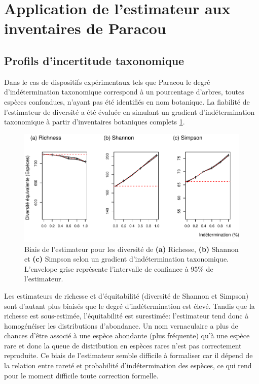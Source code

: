 \documentclass[
  11pt,
  french,
  A4paper,
  extrafontsizes,onecolumn,openright
  ]{memoir}
\begin{document}
\section{Application de l'estimateur aux inventaires de
Paracou}\label{application-de-lestimateur-aux-inventaires-de-paracou}

\subsection{Profils d'incertitude
taxonomique}\label{profils-dincertitude-taxonomique}

Dans le cas de dispositifs expérimentaux tels que Paracou le degré
d'indétermination taxonomique correspond à un pourcentage d'arbres,
toutes espèces confondues, n'ayant pas été identifiés en nom botanique.
La fiabilité de l'estimateur de diversité a été évaluée en simulant un
gradient d'indétermination taxonomique à partir d'inventaires botaniques
complets \ref{fig:FigTreesSp}.

\begin{figure}

{\centering \includegraphics[width=1\linewidth]{Manuscript_files/figure-latex/FigTreesSp-1} 

}

\caption{Biais de l'estimateur pour les diversité de \textbf{(a)} Richesse, \textbf{(b)} Shannon et \textbf{(c)} Simpson selon un gradient d'indétermination taxonomique. L'envelope grise représente l'intervalle de confiance à 95\% de l'estimateur.}\label{fig:FigTreesSp}
\end{figure}

Les estimateurs de richesse et d'équitabilité (diversité de Shannon et
Simpson) sont d'autant plus biaisés que le degré d'indétermination est
élevé. Tandis que la richesse est sous-estimée, l'équitabilité est
surestimée: l'estimateur tend donc à homogénéiser les distributions
d'abondance. Un nom vernaculaire a plus de chances d'être associé à une
espèce abondante (plus fréquente) qu'à une espèce rare et donc la queue
de distribution en espèces rares n'est pas correctement reproduite. Ce
biais de l'estimateur semble difficile à formaliser car il dépend de la
relation entre rareté et probabilité d'indétermination des espèces, ce
qui rend pour le moment difficile toute correction formelle.
\end{document}
